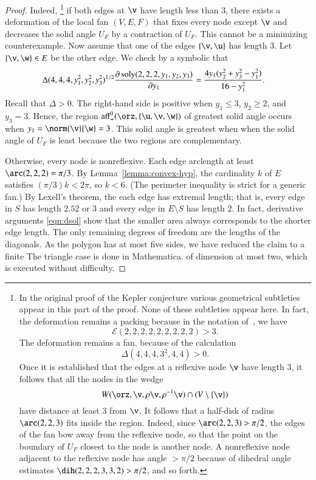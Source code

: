 \documentclass{llncs}
\def\op#1{{\hbox{#1}}}
\begin{document}
\begin{proof}
  Indeed,%
\footnote{In the original proof of the Kepler conjecture 
  various geometrical subtleties appear in this part of the
  proof.  None of these subtleties appear here.  In fact, the
  deformation remains a packing because in the notation of~\cite{Hales:2006:DCG},
 we have
\[
{\mathcal E}(2,2,2,2,2,2,2,2,2)> 3.
\]
The deformation remains a fan, because of the calculation
\[
\Delta(4,4,4,3^2,4,4)>0.
\]
Once it is established that the edges at a reflexive node $\v$ have length $3$, it
follows that all the nodes in the wedge
\[
W(\orz,\v,\rho\v,\rho^{-1}\v)\cap (V\setminus\{\v\})
\]
have distance at least $3$ from $\v$.  It follows that a half-disk
of radius $\arc(2,2,3)$ fits inside the region.  Indeed, since
$\arc(2,2,3)>\pi/2$, the edges of the fan bow away from the reflexive node, so
that the point on the boundary of $U_F$ closest to the node is another
node.  
A nonreflexive node adjacent to the reflexive node has angle $>\pi/2$
because of dihedral angle estimates $\dih(2,2,2,3,3,2)>\pi/2$, and
so forth.  } 
if both edges at $\v$ have length less than $3$, there
exists a deformation of the local fan $(V,E,F)$ that fixes every node
except $\v$ and decreases the solid angle $U_F$ by a contraction of $U_F$.  
This cannot be a
minimizing counterexample.  Now assume that one of the edges
$\{\v,\u\}$ has length $3$.  Let $\{\v,\w\}\in E$ be the other edge.
We check by a symbolic
 that
\begin{align}\label{eqn:dsol}
\Delta(4,4,4,y_1^2,y_2^2,y_3^2)^{1/2}\dfrac{\partial\,\op{soly}(2,2,2,y_1,y_2,y_3)}{\partial y_1} &= 
\dfrac{4 y_1 (y_2^2 + y_3^2- y_1^2)}{16- y_1^2}.
\end{align}
 Recall that $\Delta>0$.
The right-hand side is positive
when $y_1\le3$, $y_2\ge 2$, and $y_3=3$. 
Hence, the region
$\op{aff}^0_+(\orz,\{\u,\v,\w\})$ of greatest
solid angle occurs when $y_1=\norm{\v}{\w}=3$.  This solid angle is greatest when
when the solid angle of $U_F$ is least because  the two regions are complementary.


  Otherwise,
every node is nonreflexive.  Each edge arclength at least
$\arc(2,2,2)=\pi/3$.  By Lemma~\ref{lemma:convex-hyp}, the cardinality
$k$ of $E$ satisfies $(\pi/3)k < 2\pi$, so $k<6$.  (The perimeter inequality is
strict for a generic fan.)  By Lexell's theorem, the each edge has
extremal length;  that is, every edge in $S$ has length $2.52$ or
$3$ and every edge in $E\setminus S$ has length $2$.  In fact, derivative
arguments \eqref{eqn:dsol} show that the smaller area always
corresponds to the shorter edge length.  The only
remaining degrees of freedom are the lengths of the diagonals.  As the
polygon has at most five sides, we have reduced the claim  to a
finite  %
{The triangle case is done in Mathematica.} of dimension at
most two, which is executed without difficulty.


\end{proof}
\end{document}
